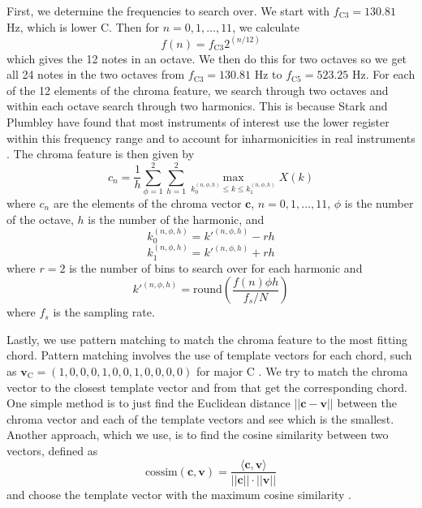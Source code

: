\documentclass[journal]{IEEEtran}
\begin{document}
First, we determine the frequencies to search over.
We start with $f_{\text{C}3} = 130.81$ Hz, which is lower C.
Then for $n = 0, 1, \ldots, 11$, we calculate
\begin{equation}
    f(n) = f_{\text{C}3}2^{(n / 12)}
    \label{eq:freq}
\end{equation}
which gives the 12 notes in an octave.
We then do this for two octaves so we get all 24 notes in the two octaves from $f_{\text{C}3} = 130.81$ Hz to $f_{\text{C}5} = 523.25$ Hz.
For each of the 12 elements of the chroma feature, we search through two octaves and within each octave search through two harmonics.
This is because Stark and Plumbley have found that most instruments of interest use the lower register within this frequency range and to account for inharmonicities in real instruments \cite{stark}.
The chroma feature is then given by
\begin{equation}
    c_n = \frac{1}{h}\sum_{\phi = 1}^2\sum_{h = 1}^2 \max_{k_0^{(n, \phi, h)} \leq k \leq k_1^{(n, \phi, h)}} X(k)
    \label{eq:chroma}
\end{equation}
where $c_n$ are the elements of the chroma vector $\mathbf{c}$, $n = 0, 1, \ldots, 11$, $\phi$ is the number of the octave, $h$ is the number of the harmonic, and 
\begin{equation*}
    k_0^{(n, \phi, h)} = k'^{(n, \phi, h)} - rh
\end{equation*}
\begin{equation*}
    k_1^{(n, \phi, h)} = k'^{(n, \phi, h)} + rh
\end{equation*}
where $r = 2$ is the number of bins to search over for each harmonic and 
\begin{equation*}
    k'^{(n, \phi, h)} = \text{round}\!\left(\frac{f(n)\phi h}{f_s / N}\right)
\end{equation*}
where $f_s$ is the sampling rate.

Lastly, we use pattern matching to match the chroma feature to the most fitting chord.
Pattern matching involves the use of template vectors for each chord, such as $\mathbf{v}_{\text{C}} = (1, 0, 0, 0, 1, 0, 0, 1, 0, 0, 0, 0)$ for major C \cite{jiang}.
We try to match the chroma vector to the closest template vector and from that get the corresponding chord.
One simple method is to just find the Euclidean distance $||\mathbf{c} - \mathbf{v}||$ between the chroma vector and each of the template vectors and see which is the smallest.
Another approach, which we use,  is to find the cosine similarity between two vectors, defined as 
\begin{equation}
    \text{cossim}(\mathbf{c}, \mathbf{v}) = \frac{\langle\mathbf{c}, \mathbf{v}\rangle}{||\mathbf{c}|| \cdot ||\mathbf{v}||}
    \label{eq:cossim}
\end{equation}
and choose the template vector with the maximum cosine similarity \cite{jiang}.
\end{document}
